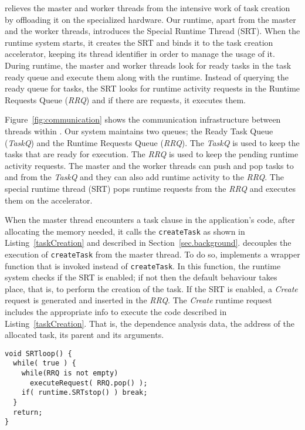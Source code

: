 {\proposal} relieves the master and worker threads from the intensive work of task creation by offloading it on the specialized hardware.
Our runtime, apart from the master and the worker threads, introduces the Special Runtime Thread (SRT). 
When the runtime system starts, it creates the SRT and binds it to the task creation accelerator, keeping its thread identifier in order to manage the usage of it.
During runtime, the master and worker threads look for ready tasks in the task ready queue and execute them along with the runtime.
Instead of querying the ready queue for tasks, the SRT looks for runtime activity requests in the Runtime Requests Queue (\textit{RRQ}) and if there are requests, it executes them.

Figure~\ref{fig:communication} shows the communication infrastructure between threads within {\proposal}.
Our system maintains two queues; the Ready Task Queue (\textit{TaskQ}) and the Runtime Requests Queue (\textit{RRQ}).
The \textit{TaskQ} is used to keep the tasks that are ready for execution. 
The \textit{RRQ} is used to keep the pending runtime activity requests. 
The master and the worker threads can push and pop tasks to and from the \textit{TaskQ} and they can also add runtime activity to the \textit{RRQ}. 
The special runtime thread (SRT) pops runtime requests from the \textit{RRQ} and executes them on the accelerator.

When the master thread encounters a task clause in the application's code, after allocating the memory needed, it calls the \texttt{createTask} as shown in Listing~\ref{taskCreation} and described in Section~\ref{sec.background}. 
{\proposal} decouples the execution of \texttt{createTask} from the master thread. 
To do so, {\proposal} implements a wrapper function that is invoked instead of \texttt{createTask}.
In this function, the runtime system checks if the SRT is enabled; if not then the default behaviour takes place, that is, to perform the creation of the task.
If the SRT is enabled, a \textit{Create} request is generated and inserted in the \textit{RRQ}.
The \textit{Create} runtime request includes the appropriate info to execute the code described in Listing~\ref{taskCreation}.
That is, the dependence analysis data, the address of the allocated task, its parent and its arguments.



\begin{lstlisting}[float, emph={SRTloop}, caption={Pseudo-code for the SRT loop.},label=SRTloop]
void SRTloop() {
  while( true ) {   
    while(RRQ is not empty) 
      executeRequest( RRQ.pop() );
    if( runtime.SRTstop() ) break;
  }
  return; 
}  
\end{lstlisting}

